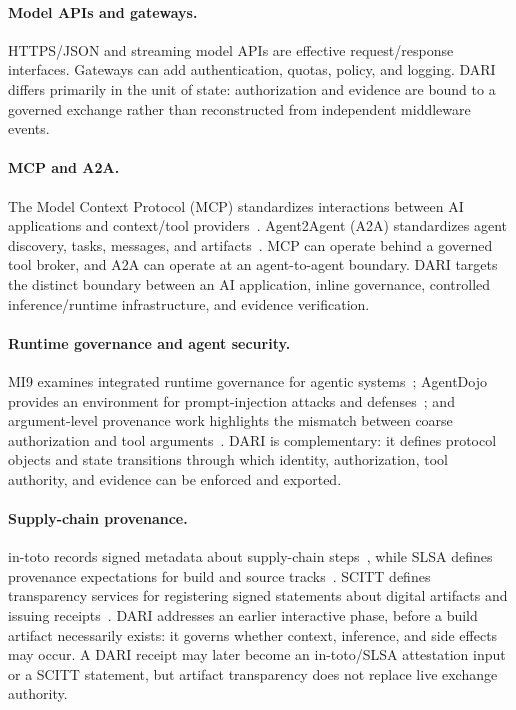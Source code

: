 \documentclass[10pt]{article}
\newcommand{\dariname}{DARI}
\begin{document}
\paragraph{Model APIs and gateways.}
HTTPS/JSON and streaming model APIs are effective request/response interfaces. Gateways can add authentication, quotas, policy, and logging. \dariname{} differs primarily in the unit of state: authorization and evidence are bound to a governed exchange rather than reconstructed from independent middleware events.

\paragraph{MCP and A2A.}
The Model Context Protocol (MCP) standardizes interactions between AI applications and context/tool providers~\cite{mcp2025}. Agent2Agent (A2A) standardizes agent discovery, tasks, messages, and artifacts~\cite{a2a2026}. MCP can operate behind a governed tool broker, and A2A can operate at an agent-to-agent boundary. \dariname{} targets the distinct boundary between an AI application, inline governance, controlled inference/runtime infrastructure, and evidence verification.

\paragraph{Runtime governance and agent security.}
MI9 examines integrated runtime governance for agentic systems~\cite{wang2025mi9}; AgentDojo provides an environment for prompt-injection attacks and defenses~\cite{debenedetti2024agentdojo}; and argument-level provenance work highlights the mismatch between coarse authorization and tool arguments~\cite{fan2026granularity}. \dariname{} is complementary: it defines protocol objects and state transitions through which identity, authorization, tool authority, and evidence can be enforced and exported.

\paragraph{Supply-chain provenance.}
in-toto records signed metadata about supply-chain steps~\cite{torresarias2019intoto,intoto}, while SLSA defines provenance expectations for build and source tracks~\cite{slsa12}. SCITT defines transparency services for registering signed statements about digital artifacts and issuing receipts~\cite{rfc9943}. \dariname{} addresses an earlier interactive phase, before a build artifact necessarily exists: it governs whether context, inference, and side effects may occur. A DARI receipt may later become an in-toto/SLSA attestation input or a SCITT statement, but artifact transparency does not replace live exchange authority.
\end{document}
